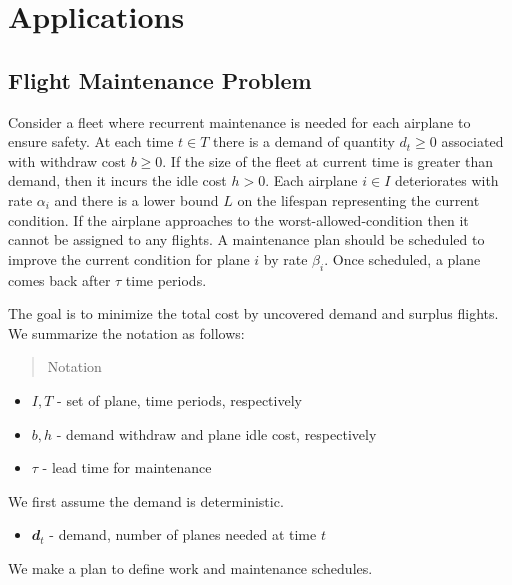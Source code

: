 \documentclass[../main]{subfiles}
\begin{document}
\hypertarget{Applications}{%
  \section{Applications}\label{applications}}

\subsection{Flight Maintenance Problem}\label{app:fmp}

Consider a fleet where recurrent maintenance is needed for each airplane to ensure safety.
At each time \(t \in T\) there is a demand of quantity \(d_t \ge 0\) associated with withdraw cost \(b \ge 0\).
If the size of the fleet at current time is greater than demand, then it incurs the idle cost \(h > 0\).
Each airplane \(i \in I\) deteriorates with rate \(\alpha_i\) and there is a lower bound \(L\) on the lifespan representing the current condition. If the airplane approaches to the worst-allowed-condition then it cannot be assigned to any flights.
A maintenance plan should be scheduled to improve the current condition for plane \(i\) by rate \(\beta_i\). Once scheduled, a plane comes back after \(\tau\) time periods.

The goal is to minimize the total cost by uncovered demand and surplus flights. We summarize the notation as follows:

\begin{quote}
  Notation
\end{quote}

\begin{itemize}
  \tightlist
  \item
        \(I, T\) - set of plane, time periods, respectively
  \item
        \(b, h\) - demand withdraw and plane idle cost, respectively
  \item
        \(\tau\) - lead time for maintenance
\end{itemize}

We first assume the demand is deterministic.

\begin{itemize}
  \tightlist
  \item
        \(\mathbfit d_t\) - demand, number of planes needed at time \(t\)
\end{itemize}

We make a plan to define work and maintenance schedules.
\end{document}

